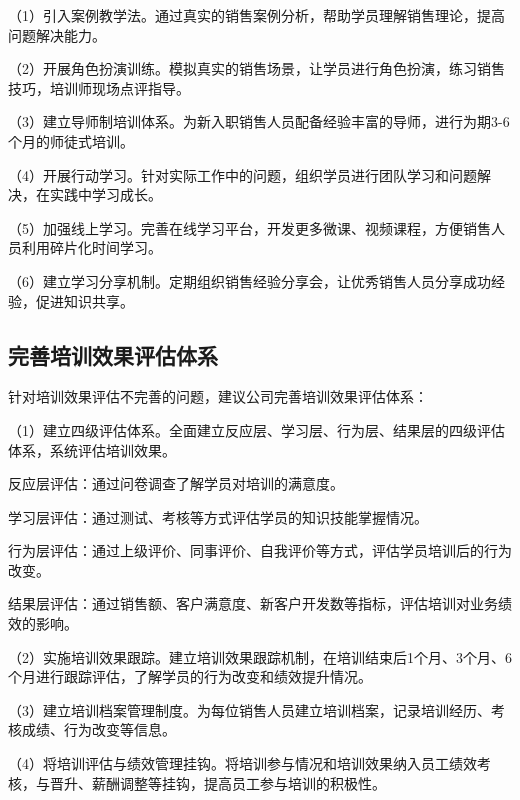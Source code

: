 （1）引入案例教学法。通过真实的销售案例分析，帮助学员理解销售理论，提高问题解决能力。

（2）开展角色扮演训练。模拟真实的销售场景，让学员进行角色扮演，练习销售技巧，培训师现场点评指导。

（3）建立导师制培训体系。为新入职销售人员配备经验丰富的导师，进行为期3-6个月的师徒式培训。

（4）开展行动学习。针对实际工作中的问题，组织学员进行团队学习和问题解决，在实践中学习成长。

（5）加强线上学习。完善在线学习平台，开发更多微课、视频课程，方便销售人员利用碎片化时间学习。

（6）建立学习分享机制。定期组织销售经验分享会，让优秀销售人员分享成功经验，促进知识共享。

\subsection{完善培训效果评估体系}

针对培训效果评估不完善的问题，建议公司完善培训效果评估体系：

（1）建立四级评估体系。全面建立反应层、学习层、行为层、结果层的四级评估体系，系统评估培训效果。

反应层评估：通过问卷调查了解学员对培训的满意度。

学习层评估：通过测试、考核等方式评估学员的知识技能掌握情况。

行为层评估：通过上级评价、同事评价、自我评价等方式，评估学员培训后的行为改变。

结果层评估：通过销售额、客户满意度、新客户开发数等指标，评估培训对业务绩效的影响。

（2）实施培训效果跟踪。建立培训效果跟踪机制，在培训结束后1个月、3个月、6个月进行跟踪评估，了解学员的行为改变和绩效提升情况。

（3）建立培训档案管理制度。为每位销售人员建立培训档案，记录培训经历、考核成绩、行为改变等信息。

（4）将培训评估与绩效管理挂钩。将培训参与情况和培训效果纳入员工绩效考核，与晋升、薪酬调整等挂钩，提高员工参与培训的积极性。

